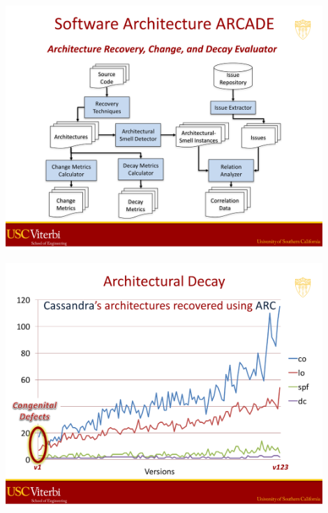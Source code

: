 \documentclass[xetex,mathserif,serif]{beamer}
\begin{document}
	\begin{frame}
		\begin{center}
			\includegraphics[width=0.9\textwidth]{medvidovic5.png}
		\end{center}
	\end{frame}

	\begin{frame}
		\begin{center}
			\includegraphics[width=0.9\textwidth]{medvidovic6.png}
		\end{center}
	\end{frame}
\end{document}
